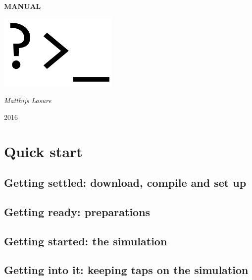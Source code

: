 \documentclass[a4paper,fleqn]{report}
\begin{document}
	
	\pagestyle{MyStyle}
	
	\begin{titlepage}
		\centering
		\null
		\vspace{5cm}

		{\huge\bfseries MANUAL\par}
		\vspace{1.5cm}
		\includegraphics[width=0.5\linewidth]{images/prompt.png}
		\vfill
		
		{\Large\itshape Matthijs Lasure\par}
		
		\vspace{1.5cm}
		
		{\large 2016\par}
		
	\end{titlepage}
	
	\tableofcontents
	
	\part{Quick start}
	
	\chapter{Getting settled: download, compile and set up}
	
	
	\chapter{Getting ready: preparations}
	
	\chapter{Getting started: the simulation}
	
	\chapter{Getting into it: keeping taps on the simulation}
	
\end{document}
